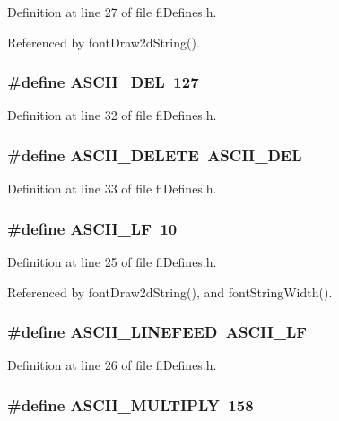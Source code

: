 Definition at line 27 of file fl\-Defines.h.

Referenced by font\-Draw2d\-String().
\subsubsection{\setlength{\rightskip}{0pt plus 5cm}\#define ASCII\_\-DEL~127}\label{flDefines_8h_3bb28e223b7c203113dc8c0387d43b36}




Definition at line 32 of file fl\-Defines.h.
\subsubsection{\setlength{\rightskip}{0pt plus 5cm}\#define ASCII\_\-DELETE~ASCII\_\-DEL}\label{flDefines_8h_2d026fa8edd8f2d4ea731fe04915427f}




Definition at line 33 of file fl\-Defines.h.
\subsubsection{\setlength{\rightskip}{0pt plus 5cm}\#define ASCII\_\-LF~10}\label{flDefines_8h_ca3b498f5936dbe4f3076a47c3e1810d}




Definition at line 25 of file fl\-Defines.h.

Referenced by font\-Draw2d\-String(), and font\-String\-Width().
\subsubsection{\setlength{\rightskip}{0pt plus 5cm}\#define ASCII\_\-LINEFEED~ASCII\_\-LF}\label{flDefines_8h_dab3cea3881d5543cef4332ad3263e4f}




Definition at line 26 of file fl\-Defines.h.
\subsubsection{\setlength{\rightskip}{0pt plus 5cm}\#define ASCII\_\-MULTIPLY~158}\label{flDefines_8h_6019587ddc75e98f2dd1a0127519b94d}




